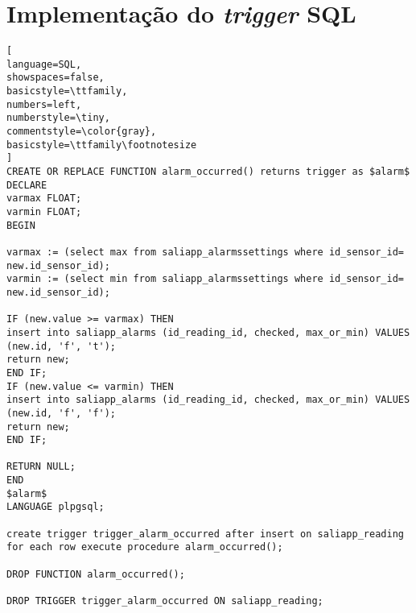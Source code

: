 \chapter{Implementação do \textit{trigger} \acs{SQL} }


\begin{lstlisting}[
language=SQL,
showspaces=false,
basicstyle=\ttfamily,
numbers=left,
numberstyle=\tiny,
commentstyle=\color{gray},
basicstyle=\ttfamily\footnotesize
]
CREATE OR REPLACE FUNCTION alarm_occurred() returns trigger as $alarm$ 
DECLARE
varmax FLOAT;
varmin FLOAT;
BEGIN

varmax := (select max from saliapp_alarmssettings where id_sensor_id= new.id_sensor_id);
varmin := (select min from saliapp_alarmssettings where id_sensor_id= new.id_sensor_id);

IF (new.value >= varmax) THEN 
insert into saliapp_alarms (id_reading_id, checked, max_or_min) VALUES (new.id, 'f', 't');
return new;
END IF;
IF (new.value <= varmin) THEN 
insert into saliapp_alarms (id_reading_id, checked, max_or_min) VALUES (new.id, 'f', 'f');
return new;
END IF;

RETURN NULL;
END
$alarm$
LANGUAGE plpgsql;

create trigger trigger_alarm_occurred after insert on saliapp_reading
for each row execute procedure alarm_occurred(); 

DROP FUNCTION alarm_occurred(); 

DROP TRIGGER trigger_alarm_occurred ON saliapp_reading;


\end{lstlisting}
